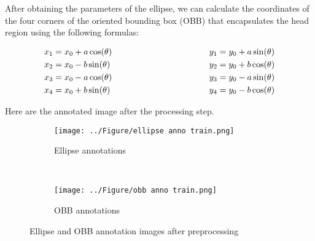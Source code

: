 \documentclass[14pt]{extreport}
\begin{document}
After obtaining the parameters of the ellipse, we can calculate the coordinates of the four corners of the oriented bounding box (OBB) that encapsulates the head region using the following formulas:

\begin{equation*}
    \begin{aligned}
        x_1 & = x_0 + a \cos(\theta) \\
        x_2 & = x_0 - b \sin(\theta) \\
        x_3 & = x_0 - a \cos(\theta) \\
        x_4 & = x_0 + b \sin(\theta) \\
    \end{aligned}
    \hspace*{4cm}
    \begin{aligned}
        y_1 & = y_0 + a \sin(\theta) \\
        y_2 & = y_0 + b \cos(\theta) \\
        y_3 & = y_0 - a \sin(\theta) \\
        y_4 & = y_0 - b \cos(\theta) \\
    \end{aligned}
\end{equation*}

Here are the annotated image after the processing step.

\begin{figure}[H]
    \begin{adjustwidth}{-3cm}{-3cm}
        \centering
        \captionsetup{justification=centering, margin=3.4cm}
        \begin{subfigure}{0.6\textwidth}
            \texttt{[image: ../Figure/ellipse anno train.png]}
            \captionsetup{justification=justified}
            \caption{Ellipse annotations}
            \label{fig:ellipse annotations}
        \end{subfigure}~
        \begin{subfigure}{0.6\textwidth}
            \texttt{[image: ../Figure/obb anno train.png]}
            \captionsetup{justification=justified}
            \caption{OBB annotations}
            \label{fig:obb annotations}
        \end{subfigure}
        \caption{Ellipse and OBB annotation images after preprocessing}
        \label{fig:ellispe and obb annotation}
    \end{adjustwidth}
\end{figure}
\end{document}
